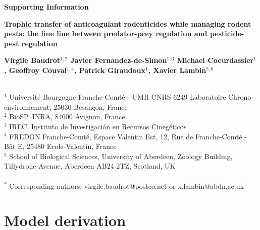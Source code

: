\documentclass[11pt]{article}
\begin{document}
\setcounter{table}{0}
\renewcommand{\thetable}{S\arabic{table}}%
\setcounter{figure}{0}
\renewcommand{\thefigure}{S\arabic{figure}}%
\setcounter{equation}{0}
\renewcommand{\theequation}{S\arabic{equation}}%


\begin{center}
	\huge\textbf{
	Supporting Information
	}\par
\end{center}

\begin{center}
	\Large\textbf{
		Trophic transfer of anticoagulant rodenticides while managing rodent pests: the fine line between predator-prey regulation and pesticide-pest regulation
	}\par
\end{center}

\vspace{.5cm}

\begin{center}
	\large\textbf{
		Virgile Baudrot$^{1,2}$ 
		Javier Fernandez-de-Simon$^{1,3}$
		Michael Coeurdassier$^1$,
		Geoffroy Couval$^{1,4}$,
		Patrick Giraudoux$^1$,
		Xavier Lambin$^{5,6}$		
	}\par	
\end{center}
~\\
$^1$ Université Bourgogne Franche-Comté - UMR CNRS 6249 Laboratoire Chrono-environnement, 25030 Besançon, France\\
$^2$ BioSP, INRA, 84000 Avignon, France\\
$^3$ IREC. Instituto de Investigación en Recursos Cinegéticos\\
$^4$ FREDON Franche-Comté, Espace Valentin Est, 12, Rue de Franche-Comté - Bât E, 25480 Ecole-Valentin, France\\
$^5$ School of Biological Sciences, University of Aberdeen, Zoology Building, Tillydrone Avenue, Aberdeen AB24 2TZ, Scotland, UK\\
~\\
$^*$ Corresponding authors: virgile.baudrot@posteo.net or x.lambin@abdn.ac.uk


 \clearpage


\section{Model derivation}
\end{document}
